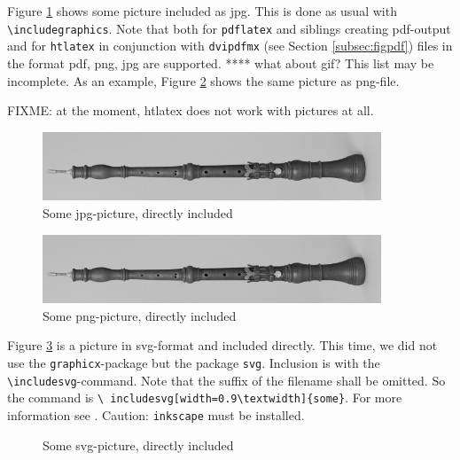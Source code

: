 \documentclass[12pt]{article}
\begin{document}
Figure \ref{fig:asIsJpg} shows some picture included as jpg. 
This is done as usual with {\tt\textbackslash includegraphics}. 
Note that both for {\tt pdflatex} and siblings creating pdf-output 
and for {\tt htlatex} in conjunction with {\tt dvipdfmx} 
(see Section \ref{subsec:figpdf}) 
files in the format pdf, \gls{png}, \gls{jpg} are supported. 
 **** what about \gls{gif}? 
This list may be incomplete. 
As an example, Figure \ref{fig:asIsPng} shows the same picture 
as png-file. 

FIXME: at the moment, htlatex does not work with pictures at all. 

\begin{figure}[htb]
\begin{center}
\includegraphics[width=0.9\textwidth]{06someJpgOboeBaroqueDennerMIR370.jpg}%
\end{center}
\caption{\label{fig:asIsJpg}Some jpg-picture, directly included }
\end{figure}

\begin{figure}[htb]
\begin{center}
\includegraphics[width=0.9\textwidth]{07somePngOboeBaroqueDennerMIR370.png}%
\end{center}
\caption{\label{fig:asIsPng}Some png-picture, directly included }
\end{figure}


Figure \ref{fig:asIsSvg} is a picture in \gls{svg}-format 
and included directly. 
This time, we did not use the {\tt graphicx}-package 
but the package {\tt svg}. 
Inclusion is with the {\tt\textbackslash includesvg}-command. 
Note that the suffix of the filename shall be omitted. 
So the command is {\tt \textbackslash
includesvg[width=0.9\textbackslash textwidth]\{some\}}. 
For more information see \cite{SvgP}. 
Caution: {\tt inkscape} must be installed. 

\begin{figure}[htb]
\begin{center}
%
\end{center}
\caption{\label{fig:asIsSvg}Some svg-picture, directly included }
\end{figure}
\end{document}
